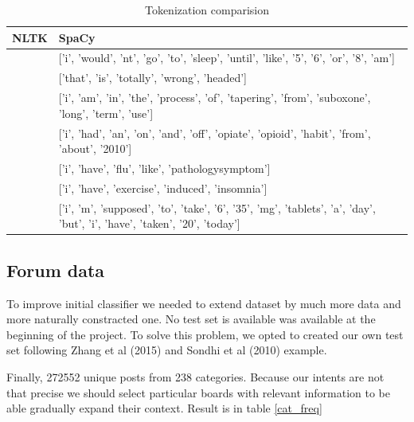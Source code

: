 \documentclass[11pt]{article}
\begin{document}
\begin{center}
\begin{table}
\begin{tabular}{ |p{7cm}|p{7cm}| }
\hline
NLTK & SpaCy \\ \hline
['i', 'wouldnt', 'go', 'to', 'sleep', 'until', 'like', '5', '6', 'or', '8am'] & 
['i', 'would', 'nt', 'go', 'to', 'sleep', 'until', 'like', '5', '6', 'or', '8', 'am'] \\ \hline
['that', 'is', 'totally', 'wrongheaded'] & ['that', 'is', 'totally', 'wrong', 'headed'] \\ \hline
['i', 'am', 'in', 'the', 'process', 'of', 'tapering', 'from', 'suboxone', 'longterm', 'use'] & 
['i', 'am', 'in', 'the', 'process', 'of', 'tapering', 'from', 'suboxone', 'long', 'term', 'use'] \\ \hline
['i', 'had', 'an', 'onandoff', 'opiateopioid', 'habit', 'from', 'about', '2010'] & 
['i', 'had', 'an', 'on', 'and', 'off', 'opiate', 'opioid', 'habit', 'from', 'about', '2010'] \\ 
\hline
['i', 'have', 'flulike', 'pathologysymptom'] & ['i', 'have', 'flu', 'like', 'pathologysymptom'] \\ \hline
['i', 'have', 'exerciseinduced', 'insomnia'] & ['i', 'have', 'exercise', 'induced', 'insomnia'] \\ \hline
['i', 'm', 'supposed', 'to', 'take', '6', '35mg', 'tablets', 'a', 'day', 'but', 'i', 'have', 'taken', '20', 'today'] & 
['i', 'm', 'supposed', 'to', 'take', '6', '35', 'mg', 'tablets', 'a', 'day', 'but', 'i', 'have', 'taken', '20', 'today'] \\ 
\hline
\end{tabular}	
\caption{\label{token_dif}Tokenization comparision}
\end{table}
\end{center}



\subsection{Forum data}

To improve initial classifier we needed to extend dataset by much more data and more naturally constracted one. No  test  set  is  available was available at the beginning of the project. To  solve this  problem,  we  opted  to  created  our  own  test set following Zhang et al (2015) and Sondhi et al (2010) example.  

Finally, 272552 unique posts from 238 categories. Because our intents are not that precise we should select particular boards with relevant information to be able gradually expand their context. Result is in table \ref{cat_freq}
\end{document}
